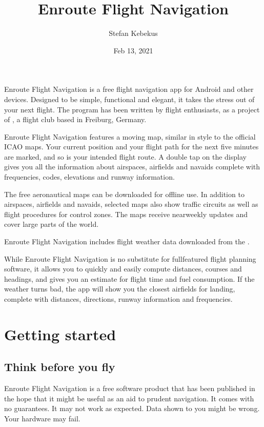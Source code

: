 \documentclass[letterpaper,10pt,english]{sphinxmanual}
\title{Enroute Flight Navigation}
\date{Feb 13, 2021}
\author{Stefan Kebekus}
\let\sphinxpxdimen\pdfpxdimen\else\newdimen\sphinxpxdimen
\begin{document}
\pagestyle{empty}
\sphinxmaketitle
\pagestyle{plain}
\sphinxtableofcontents
\pagestyle{normal}
\label{\detokenize{index::doc}}


\noindent{\hspace*{\fill}\sphinxincludegraphics[width=100\sphinxpxdimen]{{de.akaflieg_freiburg.enroute}.png}\hspace*{\fill}}

Enroute Flight Navigation is a free flight navigation app for Android and other
devices. Designed to be simple, functional and elegant, it takes the stress out
of your next flight. The program has been written by flight enthusiasts, as a
project of , a flight club
based in Freiburg, Germany.

Enroute Flight Navigation features a moving map, similar in style to the
official ICAO maps. Your current position and your flight path for the next five
minutes are marked, and so is your intended flight route. A double tap on the
display gives you all the information about airspaces, airfields and navaids \textendash{}
complete with frequencies, codes, elevations and runway information.

The free aeronautical maps can be downloaded for offline use. In addition to
airspaces, airfields and navaids, selected maps also show traffic circuits as
well as flight procedures for control zones. The maps receive near\sphinxhyphen{}weekly
updates and cover large parts of the world.

Enroute Flight Navigation includes flight weather data downloaded from the
.

While Enroute Flight Navigation is no substitute for full\sphinxhyphen{}featured flight
planning software, it allows you to quickly and easily compute distances,
courses and headings, and gives you an estimate for flight time and fuel
consumption. If the weather turns bad, the app will show you the closest
airfields for landing, complete with distances, directions, runway information
and frequencies.

\part{Getting started}


\chapter{Think before you fly}
\label{\detokenize{01-intro/think:think-before-you-fly}}\label{\detokenize{01-intro/think::doc}}
Enroute Flight Navigation is a free software product that has been published in
the hope that it might be useful as an aid to prudent navigation.  It comes with
no guarantees.  It may not work as expected.  Data shown to you might be wrong.
Your hardware may fail.
\end{document}

